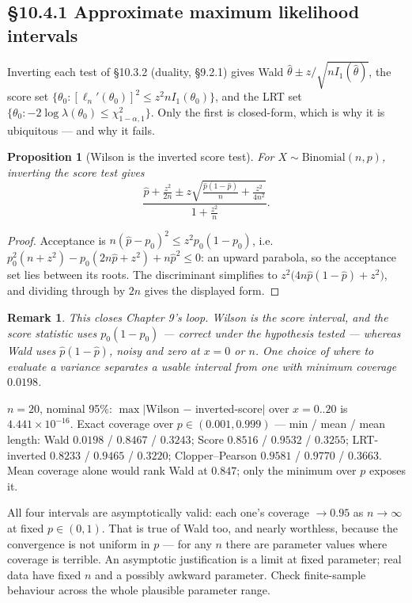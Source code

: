 \documentclass[11pt]{article}
\newtheorem{remark}[theorem]{Remark}
\newtheorem{proposition}[theorem]{Proposition}
\begin{document}
\subsection{\S10.4.1 Approximate maximum likelihood intervals}
Inverting each test of \S10.3.2 (duality, \S9.2.1) gives Wald $\hat\theta\pm z/\sqrt{nI_1(\hat\theta)}$, the score set $\{\theta_0:[\ell_n'(\theta_0)]^2\le z^2nI_1(\theta_0)\}$, and the LRT set $\{\theta_0:-2\log\lambda(\theta_0)\le\chi^2_{1-\alpha,1}\}$. Only the first is closed-form, which is why it is ubiquitous --- and why it fails.
\begin{proposition}[Wilson is the inverted score test]
For $X\sim\mathrm{Binomial}(n,p)$, inverting the score test gives
\[\frac{\hat p+\frac{z^2}{2n}\pm z\sqrt{\frac{\hat p(1-\hat p)}{n}+\frac{z^2}{4n^2}}}{1+\frac{z^2}{n}} .\]
\end{proposition}
\begin{proof}
Acceptance is $n(\hat p-p_0)^2\le z^2p_0(1-p_0)$, i.e.\ $p_0^2(n+z^2)-p_0(2n\hat p+z^2)+n\hat p^2\le0$: an upward parabola, so the acceptance set lies between its roots. The discriminant simplifies to $z^2\big(4n\hat p(1-\hat p)+z^2\big)$, and dividing through by $2n$ gives the displayed form.
\end{proof}
\begin{remark}
This closes Chapter 9's loop. Wilson \emph{is} the score interval, and the score statistic uses $p_0(1-p_0)$ --- correct under the hypothesis tested --- whereas Wald uses $\hat p(1-\hat p)$, noisy and zero at $x=0$ or $n$. One choice of where to evaluate a variance separates a usable interval from one with minimum coverage $0.0198$.
\end{remark}
\begin{simbox}
$n=20$, nominal 95\%: $\max|$Wilson $-$ inverted-score$|$ over $x=0..20$ is $4.441\times10^{-16}$. Exact coverage over $p\in(0.001,0.999)$ --- min / mean / mean length: Wald $0.0198$ / $0.8467$ / $0.3243$; Score $0.8516$ / $0.9532$ / $0.3255$; LRT-inverted $0.8233$ / $0.9465$ / $0.3220$; Clopper--Pearson $0.9581$ / $0.9770$ / $0.3663$. Mean coverage alone would rank Wald at $0.847$; only the minimum over $p$ exposes it.
\end{simbox}
\begin{flagbox}
All four intervals are asymptotically valid: each one's coverage $\to0.95$ as $n\to\infty$ at fixed $p\in(0,1)$. That is true of Wald too, and nearly worthless, because the convergence is not uniform in $p$ --- for any $n$ there are parameter values where coverage is terrible. An asymptotic justification is a limit at fixed parameter; real data have fixed $n$ and a possibly awkward parameter. Check finite-sample behaviour across the whole plausible parameter range.
\end{flagbox}
\end{document}

